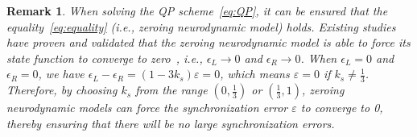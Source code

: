 \documentclass[journal,twoside,web]{ieeecolor}
\newtheorem{remark}{Remark}
\begin{document}
\begin{remark}
When solving the QP scheme~\eqref{eq:QP}, it can be ensured that the equality~\eqref{eq:equality} (i.e., zeroing neurodynamic model) holds. Existing studies have proven and validated that the zeroing neurodynamic model is able to force its state function to converge to zero~\cite{Tan2022JAS}, i.e., $\epsilon_L \to 0$ and $\epsilon_R \to 0$. When $\epsilon_L=0$ and $\epsilon_R=0$, we have $\epsilon_L-\epsilon_R=\left(1-3k_s\right)\varepsilon=0$, which means $\varepsilon=0$ if $k_s \ne \frac{1}{3}$. Therefore, by choosing $k_s$ from the range $\left(0,\frac{1}{3}\right)$ or $\left(\frac{1}{3},1\right)$, zeroing neurodynamic models can force the synchronization error $\varepsilon$ to converge to 0, thereby ensuring that there will be no large synchronization errors.
\end{remark}
\end{document}
